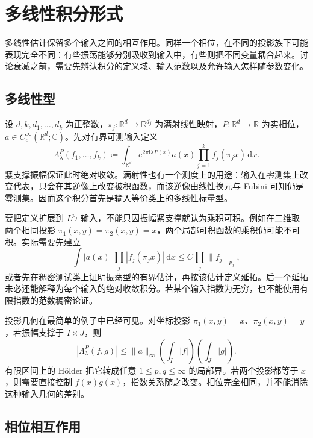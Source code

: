 \section{多线性积分形式}
\label{b2:sec:2501}

多线性估计保留多个输入之间的相互作用。同样一个相位，在不同的投影族下可能表现完全不同：有些振荡能够分别吸收到输入中，有些则把不同变量耦合起来。讨论衰减之前，需要先辨认积分的定义域、输入范数以及允许输入怎样随参数变化。

\subsection{多线性型}
\label{b2:subsec:250101}

设 \(d,k,d_1,\ldots,d_k\) 为正整数，\(\pi_j:\mathbb R^d\to\mathbb R^{d_j}\) 为满射线性映射，\(P:\mathbb R^d\to\mathbb R\) 为实相位，\(a\in C_c^\infty(\mathbb R^d;\mathbb C)\)。先对有界可测输入定义
\[
 \Lambda_\lambda^P(f_1,\ldots,f_k)
 \coloneqq\int_{\mathbb R^d}e^{2\pi\mathrm i\lambda P(x)}
             a(x)\prod_{j=1}^k f_j(\pi_jx)\,\mathrm dx.
\]
紧支撑振幅保证此时绝对收敛。满射性也有一个测度上的用途：输入在零测集上改变代表，只会在其逆像上改变被积函数，而该逆像由线性换元与 Fubini 可知仍是零测集。因而这个积分首先是输入等价类上的多线性标量型。

\ProseParagraphBreak

要把定义扩展到 \(L^{p_j}\) 输入，不能只因振幅紧支撑就认为乘积可积。例如在二维取两个相同投影 \(\pi_1(x,y)=\pi_2(x,y)=x\)，两个局部可积函数的乘积仍可能不可积。实际需要先建立
\[
 \int |a(x)|\prod_j|f_j(\pi_jx)|\,\mathrm dx
 \leq C\prod_j\|f_j\|_{p_j},
\]
或者先在稠密测试类上证明振荡型的有界估计，再按该估计定义延拓。后一个延拓未必还能解释为每个输入的绝对收敛积分。若某个输入指数为无穷，也不能使用有限指数的范数稠密论证。

\ProseParagraphBreak

投影几何在最简单的例子中已经可见。对坐标投影 \(\pi_1(x,y)=x\)、\(\pi_2(x,y)=y\)，若振幅支撑于 \(I\times J\)，则
\[
 |\Lambda_\lambda^P(f,g)|
 \leq \|a\|_\infty
       \left(\int_I|f|\right)\left(\int_J|g|\right).
\]
有限区间上的 Hölder 把它转成任意 \(1\leq p,q\leq\infty\) 的局部界。若两个投影都等于 \(x\)，则需要直接控制 \(f(x)g(x)\)，指数关系随之改变。相位完全相同，并不能消除这种输入几何的差别。

\subsection{相位相互作用}
\label{b2:subsec:250102}

